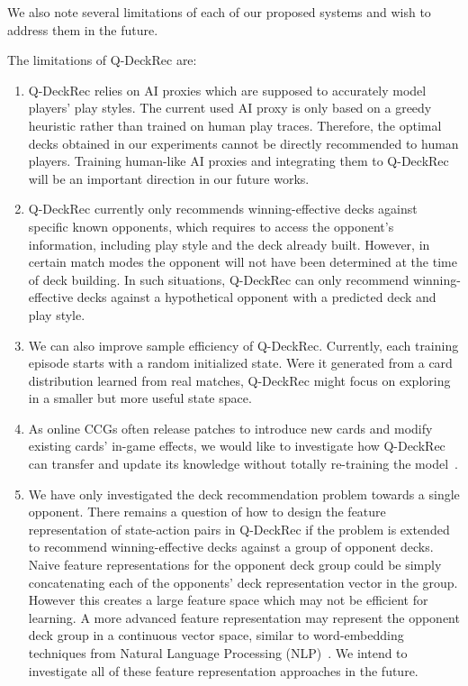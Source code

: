 We also note several limitations of each of our proposed systems and wish to address them in the future. 

The limitations of Q-DeckRec are: 
\begin{enumerate}
\item Q-DeckRec relies on AI proxies which are supposed to accurately model players' play styles. The current used AI proxy is only based on a greedy heuristic rather than trained on human play traces. Therefore, the optimal decks obtained in our experiments cannot be directly recommended to human players. Training human-like AI proxies and integrating them to Q-DeckRec will be an important direction in our future works. 

\item Q-DeckRec currently only recommends winning-effective decks against specific known opponents, which requires to access the opponent's information, including play style and the deck already built. However, in certain match modes the opponent will not have been determined at the time of deck building. In such situations, Q-DeckRec can only recommend winning-effective decks against a hypothetical opponent with a predicted deck and play style.


\item We can also improve sample efficiency of Q-DeckRec. Currently, each training episode starts with a random initialized state. Were it generated from a card distribution learned from real matches, Q-DeckRec might focus on exploring in a smaller but more useful state space. 

\item As online CCGs often release patches to introduce new cards and modify existing cards' in-game effects, we would like to investigate how Q-DeckRec can transfer and update its knowledge without totally re-training the model~\citep{taylor2009transfer}.

\item We have only investigated the deck recommendation problem towards a single opponent. There remains a question of how to design the feature representation of state-action pairs in Q-DeckRec if the problem is extended to recommend winning-effective decks against a group of opponent decks. Naive feature representations for the opponent deck group could be simply concatenating each of the opponents' deck representation vector in the group. However this creates a large feature space which may not be efficient for learning. A more advanced feature representation may represent the opponent deck group in a continuous vector space, similar to word-embedding techniques from Natural Language Processing (NLP)~\citep{mikolov2013distributed}. We intend to investigate all of these feature representation approaches in the future.
\end{enumerate}

